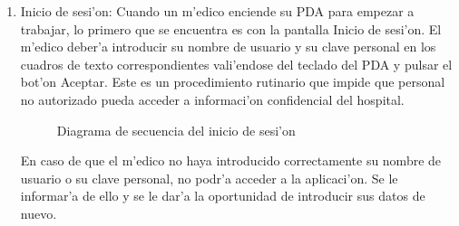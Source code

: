 \begin{enumerate}
\item Inicio de sesi'on: \newline
Cuando un m'edico enciende su PDA para empezar a trabajar, lo primero que se encuentra es con la pantalla Inicio de sesi'on. El m'edico deber'a introducir su nombre de usuario y su clave personal en los cuadros de texto correspondientes vali'endose del teclado del PDA y pulsar el bot'on Aceptar. Este es un procedimiento rutinario que impide que personal no autorizado pueda acceder a informaci'on confidencial del hospital.

\begin{figure}[h!]
	\begin{center}
     	\end{center}
    	\caption{Diagrama de secuencia del inicio de sesi'on}\label{fig:inicio_sesion}
\end{figure}

En caso de que el m'edico no haya introducido correctamente su nombre de usuario o su clave personal, no podr'a acceder a la aplicaci'on. Se le informar'a de ello y se le dar'a la oportunidad de introducir sus datos de nuevo.


\end{enumerate}
